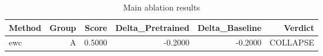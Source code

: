 \begin{table}[htbp]
\centering
\caption{Main ablation results}
\label{tab:main-results}
\begin{tabular}{lrrrrr}
\toprule
\textbf{Method} & \textbf{Group} & \textbf{Score} & \textbf{Delta\_Pretrained} & \textbf{Delta\_Baseline} & \textbf{Verdict} \\
\midrule
ewc & A & 0.5000 & -0.2000 & -0.2000 & COLLAPSE \\
\bottomrule
\end{tabular}
\end{table}